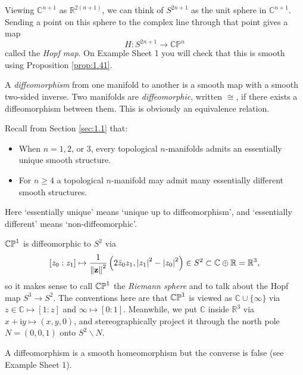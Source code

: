 \documentclass[a4paper,11pt]{article}
\begin{document}
	\begin{ex}
		Viewing $\mathbb{C}^{n+1}$ as $\mathbb{R}^{2(n+1)}$, we can think of $S^{2n+1}$ as the unit sphere in $\mathbb{C}^{n+1}$. Sending a point on this sphere to the complex line through that point gives a map
		\[
			H : S^{2n+1} \to \mathbb{CP}^{n}
		\]
		called the \emph{Hopf map}. On Example Sheet 1 you will check that this is smooth using Proposition \ref{prop:1.41}.

	\end{ex}

	\begin{defi}
		A \emph{diffeomorphism} from one manifold to another is a smooth map with a smooth two-sided inverse. Two manifolds are \emph{diffeomorphic}, written $\cong$, if there exists a diffeomorphism between them. This is obviously an equivalence relation.
	\end{defi}

	Recall from Section \ref{sec:1.1} that:
	\begin{itemize}
		\item When $n = 1,2$, or 3, every topological $n$-manifolds admits an essentially unique smooth structure.
		\item For $n \geq 4$ a topological $n$-manifold may admit many essentially different smooth structures.
	\end{itemize}

	Here `essentially unique' means `unique up to diffeomorphism', and `essentially different' means `non-diffeomorphic'.

	\begin{ex}
		$\mathbb{CP}^{1}$ is diffeomorphic to $S^2$ via
		\[
			[z_0 : z_1] \mapsto \frac{1}{\norm{\vb z}^2} \left( 2 \bar{z}_0 z_1, \abs{z_1}^2 - \abs{z_0}^2 \right) \in S^2 \subset \mathbb{C} \oplus \mathbb{R} = \mathbb{R}^3, 
		\]
		so it makes sense to call $\mathbb{CP}^{1}$ the \emph{Riemann sphere} and to talk about the Hopf map $S^3 \to S^2$. The conventions here are that $\mathbb{CP}^{1}$ is viewed as $\mathbb{C} \cup \{\infty\}$ via $z \in \mathbb{C} \mapsto [1 : z]$ and $\infty \mapsto [0:1]$. Meanwhile, we put $\mathbb{C}$ inside $\mathbb{R}^3$ via $x + \mathrm{i}y \mapsto (x,y,0)$, and stereographically project it through the north pole $N = (0,0,1)$ onto $S^2 \backslash N$.  
	\end{ex}

	\begin{rmk}
		A diffeomorphism is a smooth homeomorphism but the converse is false (see Example Sheet 1).
	\end{rmk}
\end{document}
